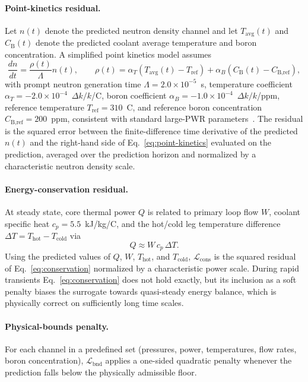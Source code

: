 \paragraph{Point-kinetics residual.} Let $n(t)$ denote the predicted neutron density channel and let $T_{\text{avg}}(t)$ and $C_{\text{B}}(t)$ denote the predicted coolant average temperature and boron concentration. A simplified point kinetics model assumes
\begin{equation}
    \frac{dn}{dt} = \frac{\rho(t)}{\Lambda} n(t),
    \qquad
    \rho(t) = \alpha_T (T_{\text{avg}}(t) - T_{\text{ref}}) + \alpha_B (C_{\text{B}}(t) - C_{\text{B,ref}}),
    \label{eq:point-kinetics}
\end{equation}
with prompt neutron generation time $\Lambda = 2.0 \times 10^{-5}$~s, temperature coefficient $\alpha_T = -2.0 \times 10^{-4}$~$\Delta k/k$/\textdegree{}C, boron coefficient $\alpha_B = -1.0 \times 10^{-4}$~$\Delta k/k$/ppm, reference temperature $T_{\text{ref}} = 310$~\textdegree{}C, and reference boron concentration $C_{\text{B,ref}} = 200$~ppm, consistent with standard large-PWR parameters~\citep{duderstadt1976nuclear}. The residual is the squared error between the finite-difference time derivative of the predicted $n(t)$ and the right-hand side of Eq.~\eqref{eq:point-kinetics} evaluated on the prediction, averaged over the prediction horizon and normalized by a characteristic neutron density scale.

\paragraph{Energy-conservation residual.} At steady state, core thermal power $Q$ is related to primary loop flow $W$, coolant specific heat $c_p = 5.5$~kJ/kg/\textdegree{}C, and the hot/cold leg temperature difference $\Delta T = T_{\text{hot}} - T_{\text{cold}}$ via
\begin{equation}
    Q \approx W \, c_p \, \Delta T.
    \label{eq:conservation}
\end{equation}
Using the predicted values of $Q$, $W$, $T_{\text{hot}}$, and $T_{\text{cold}}$, $\mathcal{L}_{\text{cons}}$ is the squared residual of Eq.~\eqref{eq:conservation} normalized by a characteristic power scale. During rapid transients Eq.~\eqref{eq:conservation} does not hold exactly, but its inclusion as a soft penalty biases the surrogate towards quasi-steady energy balance, which is physically correct on sufficiently long time scales.

\paragraph{Physical-bounds penalty.} For each channel in a predefined set (pressures, power, temperatures, flow rates, boron concentration), $\mathcal{L}_{\text{bnd}}$ applies a one-sided quadratic penalty whenever the prediction falls below the physically admissible floor.

